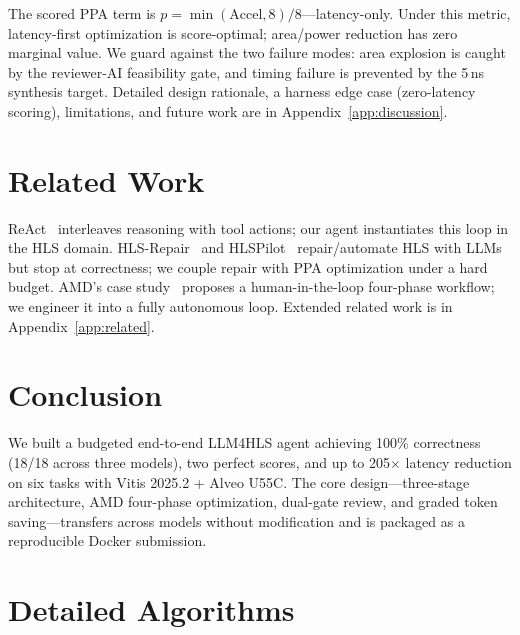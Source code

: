 \documentclass[10pt,conference,letterpaper]{IEEEtran}
\begin{document}
The scored PPA term is $p=\min(\text{Accel},8)/8$---latency-only. Under this metric, latency-first optimization is score-optimal; area/power reduction has zero marginal value. We guard against the two failure modes: area explosion is caught by the reviewer-AI feasibility gate, and timing failure is prevented by the 5\,ns synthesis target. Detailed design rationale, a harness edge case (zero-latency scoring), limitations, and future work are in Appendix~\ref{app:discussion}.

\section{Related Work}

ReAct~\cite{react} interleaves reasoning with tool actions; our agent instantiates this loop in the HLS domain. HLS-Repair~\cite{hlsrepair} and HLSPilot~\cite{hlspilot} repair/automate HLS with LLMs but stop at correctness; we couple repair with PPA optimization under a hard budget. AMD's case study~\cite{amdllm4hls} proposes a human-in-the-loop four-phase workflow; we engineer it into a fully autonomous loop. Extended related work is in Appendix~\ref{app:related}.

\section{Conclusion}

We built a budgeted end-to-end LLM4HLS agent achieving 100\% correctness (18/18 across three models), two perfect scores, and up to 205$\times$ latency reduction on six tasks with Vitis 2025.2 + Alveo U55C. The core design---three-stage architecture, AMD four-phase optimization, dual-gate review, and graded token saving---transfers across models without modification and is packaged as a reproducible Docker submission.




\appendix

\section{Detailed Algorithms}
\label{app:algorithms}
\end{document}
